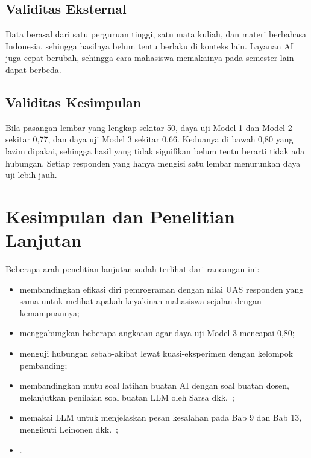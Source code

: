 \subsection{Validitas Eksternal}

Data berasal dari satu perguruan tinggi, satu mata kuliah, dan materi berbahasa Indonesia, sehingga hasilnya belum tentu berlaku di konteks lain. Layanan AI juga cepat berubah, sehingga cara mahasiswa memakainya pada semester lain dapat berbeda.

\subsection{Validitas Kesimpulan}

Bila pasangan lembar yang lengkap sekitar 50, daya uji Model 1 dan Model 2 sekitar 0,77, dan daya uji Model 3 sekitar 0,66. Keduanya di bawah 0,80 yang lazim dipakai, sehingga hasil yang tidak signifikan belum tentu berarti tidak ada hubungan. Setiap responden yang hanya mengisi satu lembar menurunkan daya uji lebih jauh.

\section{Kesimpulan dan Penelitian Lanjutan}
\label{sec:b16-kesimpulan}


Beberapa arah penelitian lanjutan sudah terlihat dari rancangan ini:

\begin{itemize}
  \item membandingkan efikasi diri pemrograman dengan nilai UAS responden yang sama untuk melihat apakah keyakinan mahasiswa sejalan dengan kemampuannya;
  \item menggabungkan beberapa angkatan agar daya uji Model 3 mencapai 0,80;
  \item menguji hubungan sebab-akibat lewat kuasi-eksperimen dengan kelompok pembanding;
  \item membandingkan mutu soal latihan buatan AI dengan soal buatan dosen, melanjutkan penilaian soal buatan LLM oleh Sarsa dkk.~\cite{sarsa2022};
  \item memakai LLM untuk menjelaskan pesan kesalahan pada Bab 9 dan Bab 13, mengikuti Leinonen dkk.~\cite{leinonen2023};
  \item {}.
\end{itemize}
